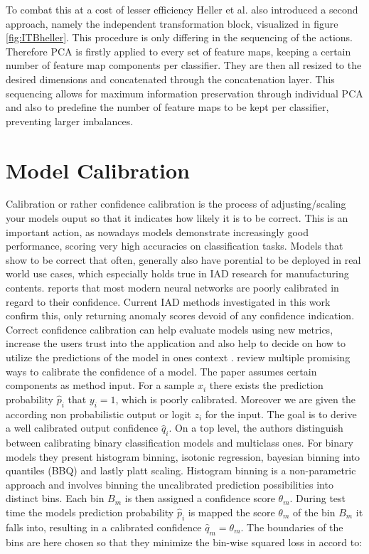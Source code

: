 To combat this at a cost of lesser efficiency Heller et al. also introduced a second approach, namely the independent transformation block, 
visualized in figure \ref{fig:ITBheller}. 
This procedure is only differing in the sequencing of the actions. Therefore PCA is firstly applied to every set of feature maps, keeping 
a certain number of feature map components per classifier. They are then all resized to the desired dimensions and concatenated through 
the concatenation layer. This sequencing allows for maximum information preservation through individual PCA and also to predefine the number 
of feature maps to be kept per classifier, preventing larger imbalances.



\section{Model Calibration}
\label{sec:modelcalibration}
Calibration or rather confidence calibration is the process of adjusting/scaling your models ouput so that it indicates how likely it is to be correct. This is an important action, as nowadays 
models demonstrate increasingly good performance, scoring very high accuracies on classification tasks. Models that show to be correct that often, generally also have porential to be deployed in 
real world use cases, which especially holds true in IAD research for manufacturing contents. \cite{Guo_2017_tempscalingetc} reports that most modern neural networks are poorly calibrated in regard 
to their confidence. Current IAD methods investigated in this work confirm this, only returning anomaly scores devoid of any confidence indication. Correct confidence calibration can help evaluate 
models using new metrics, increase the users trust into the application and also help to decide on how to utilize the predictions of the model in ones context \cite{whyUncertaintyIsImportant}. 
\newline
\cite{Guo_2017_tempscalingetc} review multiple promising ways to calibrate the confidence of a model. The paper assumes certain components as method input. For a sample $x_i$ there exists the 
prediction probability $\hat{p}_i$ that $y_i = 1$, which is poorly calibrated. Moreover we are given the according non probabilistic output or logit $z_i$ for the input. The goal is to derive a 
well calibrated output confidence $\hat{q}_i$.
On a top level, the authors distinguish between calibrating binary classification models and multiclass 
ones. For binary models they present histogram binning, isotonic regression, bayesian binning into quantiles (BBQ) and lastly platt scaling. 
Histogram binning is a non-parametric approach and involves binning the uncalibrated prediction possibilities into distinct bins. Each bin $B_m$ is then assigned a confidence score $\theta _m$. During 
test time the models prediction probability $\hat{p}_i$ is mapped the score $\theta _m$ of the bin $B_m$ it falls into, resulting in a calibrated confidence $\hat{q}_m = \theta _m$. The 
boundaries of the bins are here chosen so that they minimize the bin-wise squared loss in accord to:


